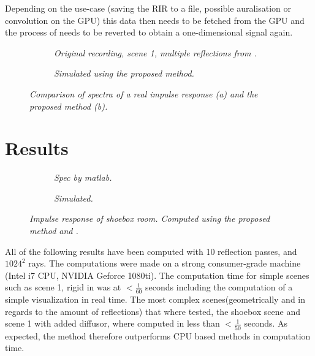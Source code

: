 \documentclass[twoside,a4paper]{article}
\begin{document}
Depending on the use-case (saving the RIR to a file, possible auralisation or convolution on the GPU) this data then needs to be fetched from the GPU and the process of needs to be reverted to obtain a one-dimensional signal again.


\begin{figure}[ht]
    \center
    \begin{subfigure}[t]{0.45\textwidth}
      \centering
      
    \caption{\label{fig:fig:multReflSpecOrig} \it Original recording, scene 1, multiple reflections from \cite{brinkmann_round_2019}. }
    \end{subfigure}%
    \begin{subfigure}[t]{0.45\textwidth}
      \centering
      
      \caption{\label{fig:multReflSpecSim} \it Simulated using the proposed method. }
    \end{subfigure}
    \caption{\it Comparison of spectra of a real impulse response (a) and the proposed method (b).}
    \label{fig:multReflSpecCompare}
\end{figure}


\section{Results}

\begin{figure}[ht]
    \center
    \begin{subfigure}[t]{0.45\textwidth}
      \centering
      
    \caption{\label{fig:shoe} \it Spec by matlab. }
    \end{subfigure}%
    \begin{subfigure}[t]{0.45\textwidth}
      \centering
      
      \caption{\label{fig:shoe} \it Simulated. }
    \end{subfigure}
    \caption{\it Impulse response of shoebox room. Computed using the proposed method and \cite{lehmann_fast_2020}.}
    \label{fig:test}
\end{figure}


All of the following results have been computed with 10 reflection passes, and $1024^2$ rays. The computations were made on a strong consumer-grade machine (Intel i7 CPU, NVIDIA Geforce 1080ti). The computation time for simple scenes such as scene 1, rigid in \cite{brinkmann_round_2019} was at $<\frac{1}{60}$ seconds including the computation of a simple visualization in real time. The most complex scenes(geometrically and in regards to the amount of reflections) that where tested, the shoebox scene and scene 1 with added diffusor, where computed in less than $<\frac{1}{50}$ seconds. As expected, the method therefore outperforms CPU based methods in computation time.  \
\end{document}
